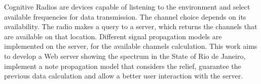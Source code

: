 \begin{foreignabstract}

Cognitive Radios are devices capable of listening to the environment and select available frequencies for data transmission. The channel choice depends on its availability. The radio makes a query to a server, which returns the channels that are available on that location. Different signal propagation models are implemented on the server, for the available channels calculation. This work aims to develop a Web server showing the spectrum in the State of Rio de Janeiro, implement a note propagation model that considers the relief, guarantee the previous data calculation and allow a better user interaction with the server.

\end{foreignabstract}
